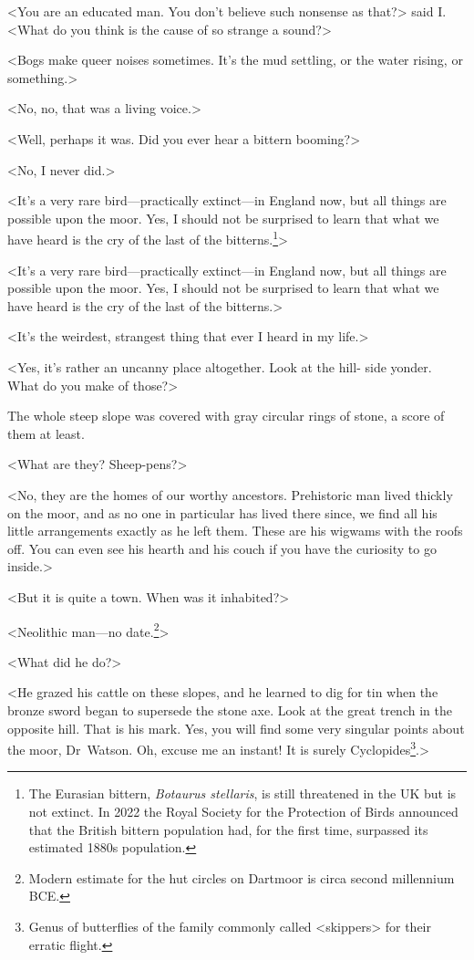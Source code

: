 <You are an educated man. You don't believe such nonsense as that?> said I\@. <What do you think is the cause of so strange a sound?>

<Bogs make queer noises sometimes. It's the mud settling, or the water rising, or something.>

<No, no, that was a living voice.>

<Well, perhaps it was. Did you ever hear a bittern booming?>

<No, I never did.>

\begin{withfootnotes}
<It's a very rare bird—practically extinct—in England now, but all things are possible upon the moor. Yes, I should not be surprised to learn that what we have heard is the cry of the last of the bitterns.\footnote{The Eurasian bittern, \textit{Botaurus stellaris}, is still threatened in the UK but is not extinct. In 2022 the Royal Society for the Protection of Birds announced that the British bittern population had, for the first time, surpassed its estimated 1880s population.}>
\end{withfootnotes}

\begin{withoutfootnotes}
<It's a very rare bird—practically extinct—in England now, but all things are possible upon the moor. Yes, I should not be surprised to learn that what we have heard is the cry of the last of the bitterns.>
\end{withoutfootnotes}

<It's the weirdest, strangest thing that ever I heard in my life.>

<Yes, it's rather an uncanny place altogether. Look at the hill- side yonder. What do you make of those?>

The whole steep slope was covered with gray circular rings of stone, a score of them at least.

<What are they? Sheep-pens?>

<No, they are the homes of our worthy ancestors. Prehistoric man lived thickly on the moor, and as no one in particular has lived there since, we find all his little arrangements exactly as he left them. These are his wigwams with the roofs off. You can even see his hearth and his couch if you have the curiosity to go inside.>

<But it is quite a town. When was it inhabited?>

\begin{withfootnotes}
<Neolithic man—no date.\footnote{Modern estimate for the hut circles on Dartmoor is circa second millennium BCE\@.}>

<What did he do?>

<He grazed his cattle on these slopes, and he learned to dig for tin when the bronze sword began to supersede the stone axe. Look at the great trench in the opposite hill. That is his mark. Yes, you will find some very singular points about the moor, Dr~Watson. Oh, excuse me an instant! It is surely Cyclopides\footnote{Genus of butterflies of the family commonly called <skippers> for their erratic flight.}.>
\end{withfootnotes}


